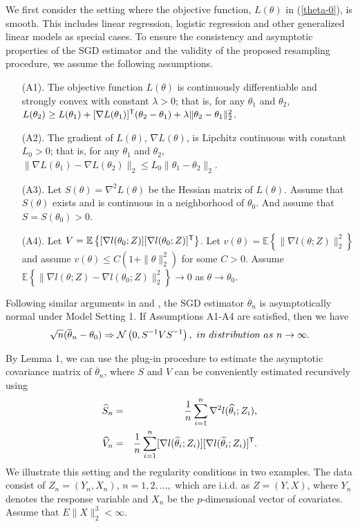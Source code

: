 \documentclass[12pt]{article}
\def\trans{^{\rm \textsf{T}}}
\def\wh{\widehat}
\def\ol{\overline}
\begin{document}
We first consider the setting where the objective function, $L(\theta)$ in (\ref{theta-0}), is smooth. This includes linear regression, logistic regression and other generalized linear models as special cases. To ensure the consistency and asymptotic properties of the SGD estimator and the validity of the proposed resampling procedure, we assume the following assumptions.
\begin{enumerate}
\item[(A1).] The objective function $L(\theta)$ is continuously differentiable and strongly convex with constant $\lambda>0$; that is, for any $\theta_1$ and $\theta_2$, $L(\theta_2)\geq L(\theta_1)+[\nabla L(\theta_1)]\trans(\theta_2-\theta_1)+\lambda\|\theta_2-\theta_1\|_2^2$.

\item[(A2).] The gradient of $L(\theta)$, $\nabla L(\theta)$, is Lipchitz continuous with constant $L_0>0$; that is, for any  $\theta_1$ and $\theta_2$, $\|\nabla L(\theta_1)-\nabla L(\theta_2)\|_2\leq L_0\|\theta_1-\theta_2\|_2$.

\item[(A3).] Let $S(\theta)=\nabla^2 L(\theta)$ be the Hessian matrix of $L(\theta)$. Assume that $S(\theta)$ exists and is continuous in a neighborhood of $\theta_0$. And assume that $S=S(\theta_0)>0$.

\item[(A4).] Let $V=\mathbb{E}\left\{[\nabla l(\theta_0; Z)][\nabla l(\theta_0; Z)]\trans\right\}$.  Let $v(\theta)=\mathbb{E}\left\{\|\nabla l(\theta; Z)\|_2^2\right\}$ and assume $v(\theta)\leq C(1+\|\theta\|^2_2)$ for some $C>0$. Assume  $\mathbb{E}\left\{\|\nabla l(\theta; Z)-\nabla l(\theta_0; Z)\|^2_2\right\}\rightarrow 0$ as $\theta \rightarrow \theta_0$.
\end{enumerate}

Following similar arguments in  \cite{ruppert1988efficient} and \cite{polyak1992acceleration}, the SGD estimator $\ol{\theta}_n$ is asymptotically normal under Model Setting 1.
{\Lemma If Assumptions A1-A4 are satisfied, then we have
\begin{eqnarray}\label{normality-set1}
\sqrt{n}(\ol{\theta}_n-\theta_0) \Rightarrow \mathcal{N}\left(0, S^{-1}VS^{-1}\right), {\mbox \ in \ distribution\ as\ } n \rightarrow \infty.
\end{eqnarray}
}

By Lemma 1, we can use the plug-in procedure to estimate the asymptotic covariance matrix of $\ol{\theta}_n$, where $S$ and $V$ can be conveniently estimated recursively using
\begin{eqnarray}
\wh{S}_n&=&\frac{1}{n}\sum_{i=1}^n \nabla^2 l(\wh{\theta}_i; Z_i), \label{plug-in-1}\\
\wh{V}_n&=&\frac{1}{n}\sum_{i=1}^n [\nabla l(\wh{\theta}_i; Z_i)][\nabla l(\wh{\theta}_i; Z_i)]\trans. \label{plug-in-2}
\end{eqnarray}
We illustrate this setting and the regularity conditions in two examples. The data consist of $Z_n=(Y_n, X_n)$, $n=1, 2, \dots,$ which are i.i.d. as $Z=(Y,X)$, where $Y_n$ denotes the response variable and $X_n$ be the $p$-dimensional vector of covariates. Assume that $E\|X\|_2^3<\infty$.
\end{document}
